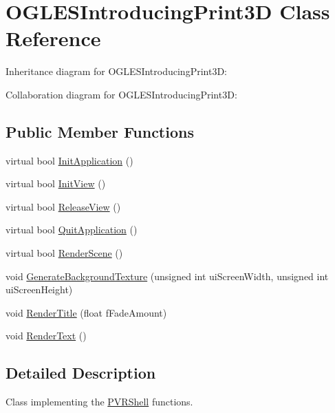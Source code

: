 \hypertarget{class_o_g_l_e_s_introducing_print3_d}{\section{O\+G\+L\+E\+S\+Introducing\+Print3\+D Class Reference}
\label{class_o_g_l_e_s_introducing_print3_d}
}


Inheritance diagram for O\+G\+L\+E\+S\+Introducing\+Print3\+D\+:


Collaboration diagram for O\+G\+L\+E\+S\+Introducing\+Print3\+D\+:
\subsection*{Public Member Functions}
\begin{DoxyCompactItemize}
\item 
virtual bool \hyperlink{class_o_g_l_e_s_introducing_print3_d_a1577668f99803b95200ac067b55d351c}{Init\+Application} ()
\item 
virtual bool \hyperlink{class_o_g_l_e_s_introducing_print3_d_a1920276802bba11772582263855520a5}{Init\+View} ()
\item 
virtual bool \hyperlink{class_o_g_l_e_s_introducing_print3_d_a47710a6f4424a1039408810cd577d63f}{Release\+View} ()
\item 
virtual bool \hyperlink{class_o_g_l_e_s_introducing_print3_d_a8095bf5af1a0e7b3013eca726034dfa3}{Quit\+Application} ()
\item 
virtual bool \hyperlink{class_o_g_l_e_s_introducing_print3_d_a4b9d708b27fbb073f8b96d9ee1ed5a02}{Render\+Scene} ()
\item 
void \hyperlink{class_o_g_l_e_s_introducing_print3_d_a616e8b398d7848ecf6b84a7b37d0ce3a}{Generate\+Background\+Texture} (unsigned int ui\+Screen\+Width, unsigned int ui\+Screen\+Height)
\item 
void \hyperlink{class_o_g_l_e_s_introducing_print3_d_aa906f31a55ab5482703011bee554d843}{Render\+Title} (float f\+Fade\+Amount)
\item 
void \hyperlink{class_o_g_l_e_s_introducing_print3_d_aa0d93174d333a69a43df67113db998e9}{Render\+Text} ()
\end{DoxyCompactItemize}


\subsection{Detailed Description}


 Class implementing the \hyperlink{class_p_v_r_shell}{P\+V\+R\+Shell} functions. 

